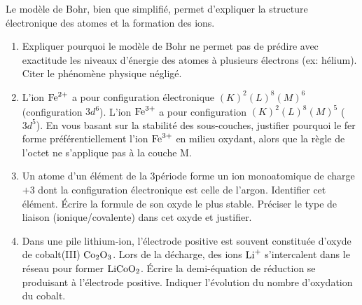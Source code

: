 \documentclass[11pt]{article}
\begin{document}
\begin{exercice}
Le modèle de Bohr, bien que simplifié, permet d'expliquer la structure électronique des atomes et la formation des ions.
\begin{enumerate}
    \item Expliquer pourquoi le modèle de Bohr ne permet pas de prédire avec exactitude les niveaux d'énergie des atomes à plusieurs électrons (ex: hélium). Citer le phénomène physique négligé.
    \item L'ion $\ce{Fe^{2+}}$ a pour configuration électronique $(K)^2 (L)^8 (M)^6$ (configuration $3d^6$). L'ion $\ce{Fe^{3+}}$ a pour configuration $(K)^2 (L)^8 (M)^5$ ($3d^5$). En vous basant sur la stabilité des sous-couches, justifier pourquoi le fer forme préférentiellement l'ion $\ce{Fe^{3+}}$ en milieu oxydant, alors que la règle de l'octet ne s'applique pas à la couche M.
    \item Un atome d'un élément de la 3\ieme période forme un ion monoatomique de charge $+3$ dont la configuration électronique est celle de l'argon. Identifier cet élément. Écrire la formule de son oxyde le plus stable. Préciser le type de liaison (ionique/covalente) dans cet oxyde et justifier.
    \item Dans une pile lithium-ion, l'électrode positive est souvent constituée d'oxyde de cobalt(III) $\ce{Co2O3}$. Lors de la décharge, des ions $\ce{Li+}$ s'intercalent dans le réseau pour former $\ce{LiCoO2}$. Écrire la demi-équation de réduction se produisant à l'électrode positive. Indiquer l'évolution du nombre d'oxydation du cobalt.
\end{enumerate}
\end{exercice}
\end{document}
